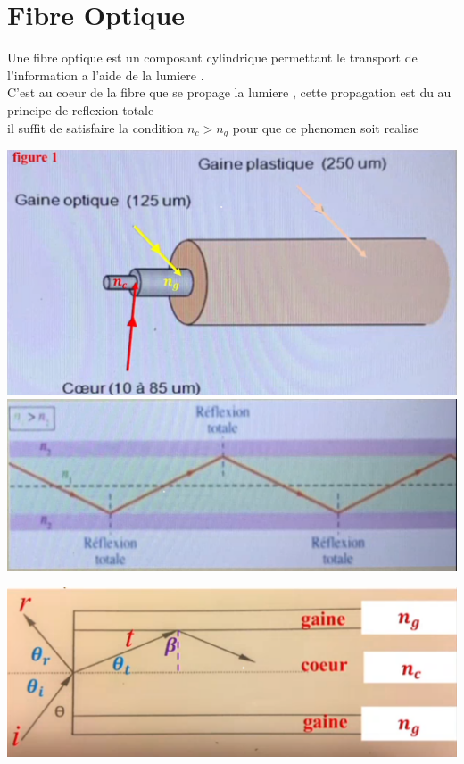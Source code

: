 \documentclass[12pt]{book}
\begin{document}
        \section{Fibre Optique}
            \begin{minipage}{0.6\linewidth}
                Une fibre optique est un composant cylindrique permettant le transport de l'information a l'aide de la lumiere . \\
                C'est au coeur de la fibre que se propage la lumiere , cette propagation est du au principe de reflexion totale \\
                il suffit de satisfaire la condition $ n_c>n_g $ pour que ce phenomen soit realise
            \end{minipage}
            \begin{minipage}{0.39\linewidth}
                \includegraphics[width=\linewidth]{pic/fibreoptique.png}
                \includegraphics[width=\linewidth]{pic/fibreoptique2.png}           
            \end{minipage}
            \begin{center}
                \includegraphics[width=0.7\linewidth]{pic/fibreoptique3.png}
            \end{center}
\end{document}
